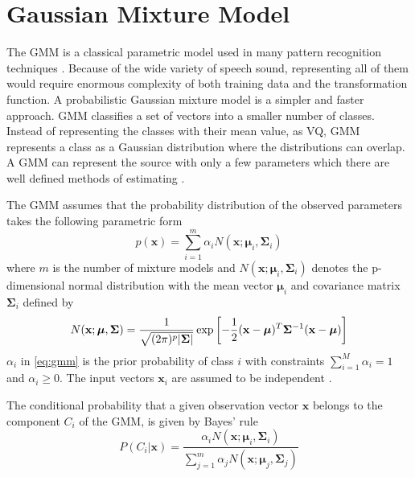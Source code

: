 \section{Gaussian Mixture Model} %
\label{the:gaussian_mixture_model}
The GMM is a classical parametric model used in many pattern recognition techniques \cite{stylianou98}. Because of the wide variety of speech sound, representing all of them would require enormous complexity of both training data and the transformation function. A probabilistic Gaussian mixture model is a simpler and faster approach. GMM classifies a set of vectors into a smaller number of classes. Instead of representing the classes with their mean value, as VQ, GMM represents a class as a Gaussian distribution where the distributions can overlap. A GMM can represent the source with only a few parameters which there are well defined methods of estimating \cite{taletek}.

The GMM assumes that the probability distribution of the observed parameters takes the following parametric form
\begin{equation}
	\label{eq:gmm}
	p(\mathbf{x}) = \sum_{i=1}^{m} \alpha_i N(\mathbf{x}; \boldsymbol{\mu}_i, \mathbf{\Sigma}_i)
\end{equation}
where $m$ is the number of mixture models and $N(\mathbf{x}; \boldsymbol{\mu}_i, \mathbf{\Sigma}_i)$ denotes the p-dimensional normal distribution \cite{statistikk} with the mean vector $\boldsymbol{\mu}_i$ and covariance matrix $\mathbf{\Sigma}_i$ defined by
\begin{equation}
	N(\mathbf{x}; \boldsymbol{\mu}, \mathbf{\Sigma}) = \frac{1}{\sqrt{(2\pi)^p\lvert\mathbf{\Sigma}\rvert}} \exp\left[-\frac{1}{2} (\mathbf{x} -\boldsymbol{\mu})^T \mathbf{\Sigma}^{-1} (\mathbf{x} -\boldsymbol{\mu})\right]
\end{equation}
$\alpha_i$ in \eqref{eq:gmm} is the prior probability of class $i$ with constraints $\sum_{i=1}^{M}\alpha_i = 1$ and $\alpha_i \geq 0$. The input vectors $\mathbf{x}_i$ are assumed to be independent \cite{stylianou98}.

The conditional probability that a given observation vector $\mathbf{x}$ belongs to the component $C_i$ of the GMM, is given by Bayes' rule \cite{statistikk}
\begin{equation}
	\label{eq:bayes}
	P(C_i\vert \mathbf{x}) = \frac{\alpha_i N(\mathbf{x}; \boldsymbol{\mu}_i, \mathbf{\Sigma}_i)}{\sum_{j=1}^{m}\alpha_j N(\mathbf{x}; \boldsymbol{\mu}_j, \mathbf{\Sigma}_j)}
\end{equation}

